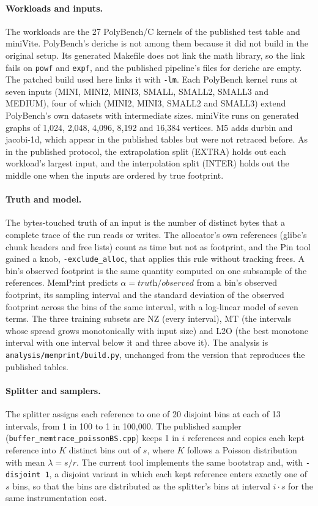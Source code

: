 \documentclass[11pt]{article}
\newcommand{\memprint}{MemPrint}
\begin{document}
\paragraph{Workloads and inputs.}
The workloads are the 27 PolyBench/C kernels of the published test table and miniVite. PolyBench's deriche is not
among them because it did not build in the original setup. Its generated Makefile does not link the math library,
so the link fails on \texttt{powf} and \texttt{expf}, and the published pipeline's files for deriche are empty. The
patched build used here links it with \texttt{-lm}. Each PolyBench kernel runs
at seven inputs (MINI, MINI2, MINI3, SMALL, SMALL2, SMALL3 and MEDIUM), four of which (MINI2, MINI3, SMALL2 and SMALL3) extend PolyBench's own datasets with intermediate sizes. miniVite runs on generated graphs of 1,024, 2,048, 4,096, 8,192 and 16,384
vertices. M5 adds durbin and jacobi-1d, which appear in the published tables but were not retraced before. As in
the published protocol, the extrapolation split (EXTRA) holds out each workload's largest input, and the
interpolation split (INTER) holds out the middle one when the inputs are ordered by true footprint.

\paragraph{Truth and model.}
The bytes-touched truth of an input is the number of distinct bytes that a complete trace of the run reads or
writes. The allocator's own references (glibc's chunk headers and free lists) count as time but not as footprint,
and the Pin tool gained a knob, \texttt{-exclude\_alloc}, that applies this rule without tracking frees. A bin's
observed footprint is the same quantity computed on one subsample of the references. \memprint{} predicts
$\alpha = \textit{truth} / \textit{observed}$ from a bin's observed footprint, its sampling interval and the
standard deviation of the observed footprint across the bins of the same interval, with a log-linear model of
seven terms. The three training subsets are NZ (every interval), MT (the intervals whose spread grows monotonically
with input size) and L2O (the best monotone interval with one interval below it and three above it). The analysis
is \texttt{analysis/memprint/build.py}, unchanged from the version that reproduces the published tables.

\paragraph{Splitter and samplers.}
The splitter assigns each reference to one of 20 disjoint bins at each of 13 intervals, from 1 in 100 to
1 in 100,000. The published sampler (\texttt{buffer\_memtrace\_poissonBS.cpp}) keeps 1 in $i$ references and
copies each kept reference into $K$ distinct bins out of $s$, where $K$ follows a Poisson distribution with mean
$\lambda = s/r$. The current tool implements the same bootstrap and, with \texttt{-disjoint 1}, a disjoint variant
in which each kept reference enters exactly one of $s$ bins, so that the bins are distributed as the splitter's
bins at interval $i \cdot s$ for the same instrumentation cost.
\end{document}

